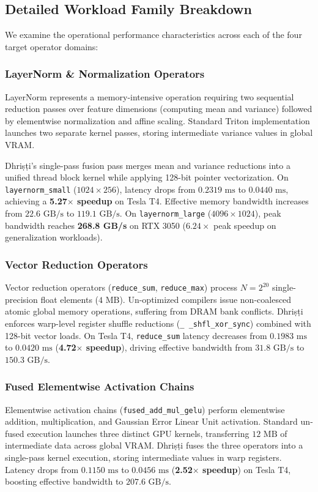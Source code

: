 \documentclass[10pt,journal,compsoc]{IEEEtran}
\begin{document}

\subsection{Detailed Workload Family Breakdown}
We examine the operational performance characteristics across each of the four target operator domains:

\subsubsection{LayerNorm \& Normalization Operators}
LayerNorm represents a memory-intensive operation requiring two sequential reduction passes over feature dimensions (computing mean and variance) followed by elementwise normalization and affine scaling. Standard Triton implementation launches two separate kernel passes, storing intermediate variance values in global VRAM.

Dhri\d{s}\d{t}i's single-pass fusion pass merges mean and variance reductions into a unified thread block kernel while applying 128-bit pointer vectorization. On \texttt{layernorm\_small} ($1024 \times 256$), latency drops from $0.2319\text{ ms}$ to $0.0440\text{ ms}$, achieving a \textbf{5.27$\times$ speedup} on Tesla T4. Effective memory bandwidth increases from $22.6\text{ GB/s}$ to $119.1\text{ GB/s}$. On \texttt{layernorm\_large} ($4096 \times 1024$), peak bandwidth reaches \textbf{268.8 GB/s} on RTX 3050 ($6.24\times$ peak speedup on generalization workloads).

\subsubsection{Vector Reduction Operators}
Vector reduction operators (\texttt{reduce\_sum}, \texttt{reduce\_max}) process $N = 2^{20}$ single-precision float elements ($4\text{ MB}$). Un-optimized compilers issue non-coalesced atomic global memory operations, suffering from DRAM bank conflicts. Dhri\d{s}\d{t}i enforces warp-level register shuffle reductions (\texttt{\_ \_shfl\_xor\_sync}) combined with 128-bit vector loads. On Tesla T4, \texttt{reduce\_sum} latency decreases from $0.1983\text{ ms}$ to $0.0420\text{ ms}$ (\textbf{4.72$\times$ speedup}), driving effective bandwidth from $31.8\text{ GB/s}$ to $150.3\text{ GB/s}$.

\subsubsection{Fused Elementwise Activation Chains}
Elementwise activation chains (\texttt{fused\_add\_mul\_gelu}) perform elementwise addition, multiplication, and Gaussian Error Linear Unit activation. Standard un-fused execution launches three distinct GPU kernels, transferring $12\text{ MB}$ of intermediate data across global VRAM. Dhri\d{s}\d{t}i fuses the three operators into a single-pass kernel execution, storing intermediate values in warp registers. Latency drops from $0.1150\text{ ms}$ to $0.0456\text{ ms}$ (\textbf{2.52$\times$ speedup}) on Tesla T4, boosting effective bandwidth to $207.6\text{ GB/s}$.
\end{document}
